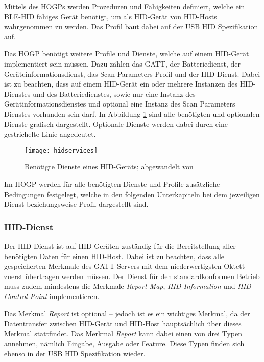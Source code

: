 Mittels des \acp{HOGP} werden Prozeduren und Fähigkeiten definiert, welche ein \acs{BLE}-\acs{HID} fähiges Gerät benötigt, um als \acs{HID}-Gerät von \acs{HID}-Hosts wahrgenommen zu werden. Das Profil baut dabei auf der USB \acs{HID} Spezifikation auf. \cite[S.~9]{bluetoothHOGP}

Das \acf{HOGP} benötigt weitere Profile und Dienste, welche auf einem \acs{HID}-Gerät implementiert sein müssen. Dazu zählen das \acs{GATT}, der Batteriedienst, der Geräteinformationsdienst, das Scan Parameters Profil und der \acs{HID} Dienst. Dabei ist zu beachten, dass auf einem \acs{HID}-Gerät ein oder mehrere Instanzen des \acs{HID}-Dienstes und des Batteriedienstes, sowie nur eine Instanz des Gerätinformationsdienstes und optional eine Instanz des Scan Parameters Dienstes vorhanden sein darf. \cite[S.~9, S.~11]{bluetoothHOGP} In Abbildung \ref{fig:hidservices} sind alle benötigten und optionalen Dienste grafisch dargestellt. Optionale Dienste werden dabei durch eine gestrichelte Linie angedeutet.

\begin{figure}[h]
    \centering
    \texttt{[image: hidservices]}
    \caption{Benötigte Dienste eines \acs{HID}-Geräts; abgewandelt von \cite[S.~11]{bluetoothHOGP}}
    \label{fig:hidservices}
\end{figure}

Im \acl{HOGP} werden für alle benötigten Dienste und Profile zusätzliche Bedingungen festgelegt, welche in den folgenden Unterkapiteln bei dem jeweiligen Dienst beziehungsweise Profil dargestellt sind.

\subsubsection{\ac{HID}-Dienst}

Der \acs{HID}-Dienst ist auf \acs{HID}-Geräten zuständig für die Bereitstellung aller benötigten Daten für einen \acs{HID}-Host. Dabei ist zu beachten, dass alle gespeicherten Merkmale des \acs{GATT}-Servers mit dem niederwertigsten Oktett zuerst übertragen werden müssen. Der Dienst für den standardkonformen Betrieb muss zudem mindestens die Merkmale \textit{Report Map}, \textit{HID Information} und \textit{HID Control Point} implementieren. \cite[S.~8ff.]{bluetoothHIDS}

Das Merkmal \textit{Report} ist optional -- jedoch ist es ein wichtiges Merkmal, da der Datentransfer zwischen \acs{HID}-Gerät und \acs{HID}-Host hauptsächlich über dieses Merkmal stattfindet. Das Merkmal \textit{Report} kann dabei einen von drei Typen annehmen, nämlich Eingabe, Ausgabe oder Feature. Diese Typen finden sich ebenso in der USB \acs{HID} Spezifikation wieder. \cite[S.~11f.]{bluetoothHIDS}

